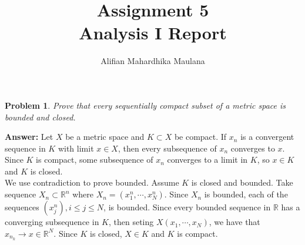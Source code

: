 \documentclass[a4paper,12pt]{article}
\title{Assignment 5 \\ Analysis I Report}
\author{Alifian Mahardhika Maulana}
\newtheorem{prob}{Problem}[]
\theoremstyle{definition}
\newcommand{\R}{\mathbb{R}}
\begin{document}
\maketitle
\begin{prob}
	Prove that every sequentially compact subset of a metric space is bounded and closed.
\end{prob}
	\textbf{Answer:}
	Let $X$ be a metric space and $K \subset X$ be compact. If $x_n$ is a convergent sequence in $K$ with limit $x \in X$, then every subsequence of $x_n$ converges to $x$. Since $K$ is compact, some subsequence of $x_n$ converges to a limit in $K$, so $x \in K$ and $K$ is closed.\\
	\newline
	We use contradiction to prove bounded. Assume $K$ is closed and bounded. Take sequence $X_n \subset \R^n$ where $X_n = (x_1^n, \cdots, x_N^n)$. Since $X_n$ is bounded, each of the sequences $(x_j^n),i\leq j \leq N$, is bounded. Since every bounded sequence in $\R$ has a converging subsequence in $K$, then seting $X(x_1,\cdots,x_N)$, we have that $x_{n_k} \to x \in \R^N$. Since $K$ is closed, $X \in K$ and $K$ is compact.
	
\end{document}

